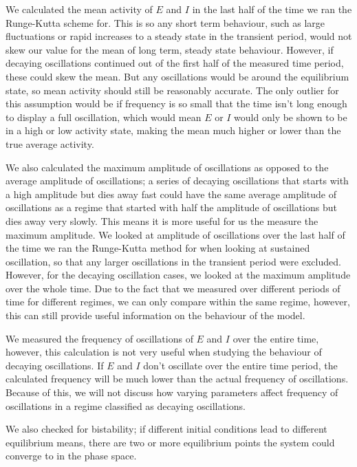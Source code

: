 \documentclass[10pt]{article}
\begin{document}
\begin{flushleft}
We calculated the mean activity of $E$ and $I$ in the last half of the time we ran the Runge-Kutta scheme for. This is so any short term behaviour, such as large fluctuations or rapid increases to a steady state in the transient period, would not skew our value for the mean of long term, steady state behaviour. However, if decaying oscillations continued out of the first half of the measured time period, these could skew the mean. But any oscillations would be around the equilibrium state, so mean activity should still be reasonably accurate. The only outlier for this assumption would be if frequency is so small that the time isn't long enough to display a full oscillation, which would mean $E$ or $I$ would only be shown to be in a high or low activity state, making the mean much higher or lower than the true average activity.
\newline

We also calculated the maximum amplitude of oscillations as opposed to the average amplitude of oscillations; a series of decaying oscillations that starts with a high amplitude but dies away fast could have the same average amplitude of oscillations as a regime that started with half the amplitude of oscillations but dies away very slowly. This means it is more useful for us the measure the maximum amplitude. We looked at amplitude of oscillations over the last half of the time we ran the Runge-Kutta method for when looking at sustained oscillation, so that any larger oscillations in the transient period were excluded. However, for the decaying oscillation cases, we looked at the maximum amplitude over the whole time. Due to the fact that we measured over different periods of time for different regimes, we can only compare within the same regime, however, this can still provide useful information on the behaviour of the model.
\newline

We measured the frequency of oscillations of $E$ and $I$ over the entire time, however, this calculation is not very useful when studying the behaviour of decaying oscillations. If $E$ and $I$ don't oscillate over the entire time period, the calculated frequency will be much lower than the actual frequency of oscillations. Because of this, we will not discuss how varying parameters affect frequency of oscillations in a regime classified as decaying oscillations.
\newline

We also checked for bistability; if different initial conditions lead to different equilibrium means, there are two or more equilibrium points the system could converge to in the phase space. 
\newline



\end{flushleft}
\end{document}
